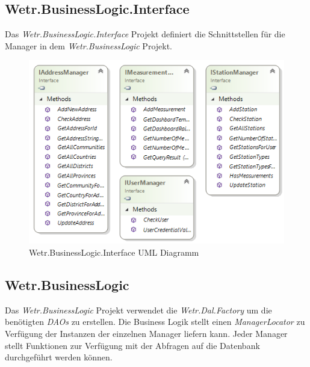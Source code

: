 \newpage
\subsection{Wetr.BusinessLogic.Interface}
Das \textit{Wetr.BusinessLogic.Interface} Projekt definiert die Schnittstellen für die Manager in dem \textit{Wetr.BusinessLogic} Projekt.

\begin{figure}[H]
\centering
\includegraphics[width=\textwidth]{pictures/BusinessLogic_Interface.png}
\caption{Wetr.BusinessLogic.Interface UML Diagramm}
\label{fig:Wetr.BusinessLogic}
\end{figure}
\raggedright

\newpage
\subsection{Wetr.BusinessLogic}
Das \textit{Wetr.BusinessLogic} Projekt verwendet die \textit{Wetr.Dal.Factory} um die benötigten \textit{DAOs} zu erstellen. Die Business Logik stellt einen \textit{ManagerLocator} zu Verfügung der Instanzen der einzelnen Manager liefern kann. Jeder Manager stellt Funktionen zur Verfügung mit der Abfragen auf die Datenbank durchgeführt werden können.

